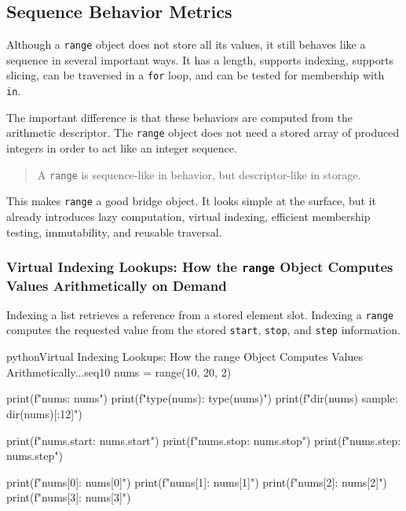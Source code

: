 \subsection{Sequence Behavior Metrics}

Although a \texttt{range} object does not store all its values, it still behaves like a sequence in several important ways. It has a length, supports indexing, supports slicing, can be traversed in a \texttt{for} loop, and can be tested for membership with \texttt{in}.

The important difference is that these behaviors are computed from the arithmetic descriptor. The \texttt{range} object does not need a stored array of produced integers in order to act like an integer sequence.

\begin{quote}
A \texttt{range} is sequence-like in behavior, but descriptor-like in storage.
\end{quote}

This makes \texttt{range} a good bridge object. It looks simple at the surface, but it already introduces lazy computation, virtual indexing, efficient membership testing, immutability, and reusable traversal.

\subsubsection{Virtual Indexing Lookups: How the \texttt{range} Object Computes Values Arithmetically on Demand}

Indexing a list retrieves a reference from a stored element slot. Indexing a \texttt{range} computes the requested value from the stored \texttt{start}, \texttt{stop}, and \texttt{step} information.

\begin{codebox}[]{python}{Virtual Indexing Lookups: How the range Object Computes Values Arithmetically...}{seq10}
nums = range(10, 20, 2)

print(f"nums: {nums}")
print(f"type(nums): {type(nums)}")
print(f"dir(nums) sample: {dir(nums)[:12]}")

print(f"nums.start: {nums.start}")
print(f"nums.stop: {nums.stop}")
print(f"nums.step: {nums.step}")

print(f"nums[0]: {nums[0]}")
print(f"nums[1]: {nums[1]}")
print(f"nums[2]: {nums[2]}")
print(f"nums[3]: {nums[3]}")
\end{codebox}


